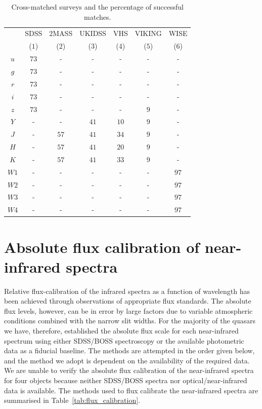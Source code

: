\begin{table}
  \centering
  \footnotesize 
    \begin{tabular}{ccccccc} 
    \hline
     & SDSS & $2$MASS & UKIDSS & VHS & VIKING & WISE \\
     & ($1$) & ($2$) & ($3$) & ($4$) & ($5$) & ($6$) \\ 
    \hline
    $u$ & $73$ & - & - & - & - & - \\
    $g$ & $73$ & - & - & - & - & - \\
    $r$ & $73$ & - & - & - & - & - \\
    $i$ & $73$ & - & - & - & - & - \\
    $z$ & $73$ & - & - & - & $9$ & - \\
    $Y$ & - & - & $41$ & $10$ & 9 & - \\
    $J$ & - & $57$ & $41$ & $34$ & $9$ & - \\
    $H$ & - & $57$ & $41$ & $20$ & $9$ & - \\
    $K$ & - & $57$ & $41$ & $33$ & $9$ & - \\
    $W1$ & - & - & - & - & - & $97$ \\
    $W2$ & - & - & - & - & - & $97$ \\
    $W3$ & - & - & - & - & - & $97$ \\
    $W4$ & - & - & - & - & - & $97$ \\
    \hline
    \end{tabular}
    \caption[{Cross-matched surveys and the percentage of successful matches.}]{Cross-matched surveys and the percentage of successful matches.}
  \label{tab:cross-matching}
\end{table} 

\section{Absolute flux calibration of near-infrared spectra}

Relative flux-calibration of the infrared spectra as a function of wavelength has been achieved through observations of appropriate flux standards. 
The absolute flux levels, however, can be in error by large factors due to variable atmospheric conditions combined with the narrow slit widths. 
For the majority of the quasars we have, therefore, established the absolute flux scale for each near-infrared spectrum using either SDSS/BOSS spectroscopy or the available photometric data as a fiducial baseline.
The methods are attempted in the order given below, and the method we adopt is dependent on the availability of the required data. 
We are unable to verify the absolute flux calibration of the near-infrared spectra for four objects because neither SDSS/BOSS spectra nor optical/near-infrared data is available. 
The methods used to flux calibrate the near-infrared spectra are summarised in Table~\ref{tab:flux_calibration}. 

